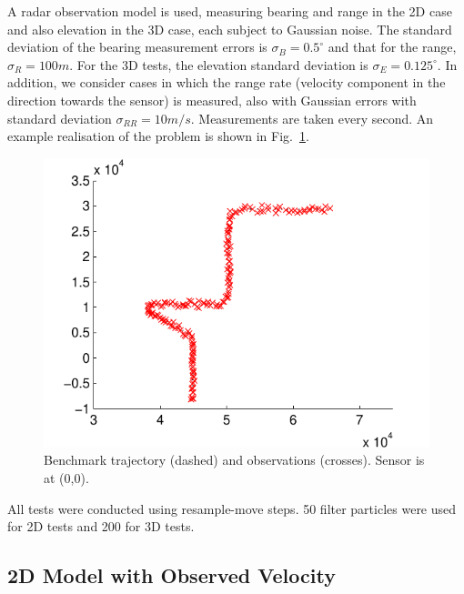 \documentclass[conference]{IEEEtran}
\begin{document}
A radar observation model is used, measuring bearing and range in the 2D case and also elevation in the 3D case, each subject to Gaussian noise. The standard deviation of the bearing measurement errors is $\sigma_B = 0.5^{\circ}$ and that for the range, $\sigma_R = 100m$. For the 3D tests, the elevation standard deviation is $\sigma_E = 0.125^{\circ}$. In addition, we consider cases in which the range rate (velocity component in the direction towards the sensor) is measured, also with Gaussian errors with standard deviation $\sigma_{RR} = 10m/s$. Measurements are taken every second. An example realisation of the problem is shown in Fig.~\ref{fig:2D_ground_truth}.
%
\begin{figure}
\centering
\includegraphics[width=0.95\columnwidth]{images/benchmark_problem.pdf}
\caption{Benchmark trajectory (dashed) and observations (crosses). Sensor is at (0,0).}
\label{fig:2D_ground_truth}
\end{figure}

All tests were conducted using resample-move steps. 50 filter particles were used for 2D tests and 200 for 3D tests.



\subsection{2D Model with Observed Velocity}
\end{document}
